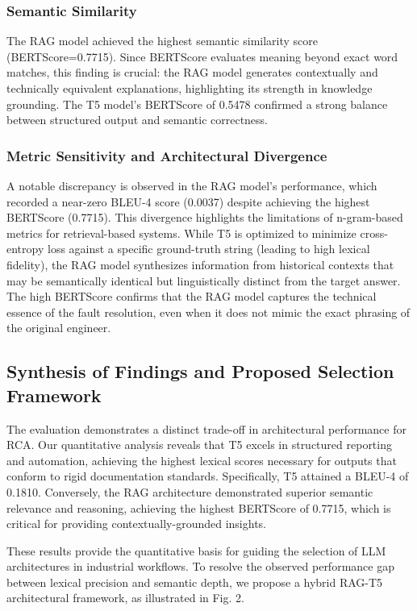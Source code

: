 \documentclass[10pt,twocolumn,journal]{IEEEtran}
\begin{document}
\subsubsection{Semantic Similarity}
The RAG model achieved the highest semantic similarity score (BERTScore=0.7715). Since BERTScore evaluates meaning beyond exact word matches, this finding is crucial: the RAG model generates contextually and technically equivalent explanations, highlighting its strength in knowledge grounding. The T5 model's BERTScore of 0.5478 confirmed a strong balance between structured output and semantic correctness.

\subsubsection{Metric Sensitivity and Architectural Divergence}
A notable discrepancy is observed in the RAG model's performance, which recorded a near-zero BLEU-4 score (0.0037) despite achieving the highest BERTScore (0.7715). This divergence highlights the limitations of n-gram-based metrics for retrieval-based systems. While T5 is optimized to minimize cross-entropy loss against a specific ground-truth string (leading to high lexical fidelity), the RAG model synthesizes information from historical contexts that may be semantically identical but linguistically distinct from the target answer. The high BERTScore confirms that the RAG model captures the technical essence of the fault resolution, even when it does not mimic the exact phrasing of the original engineer.

\subsection{Synthesis of Findings and Proposed Selection Framework}
\label{sec:synthesis}

The evaluation demonstrates a distinct trade-off in architectural performance for RCA. Our quantitative analysis reveals that T5 excels in structured reporting and automation, achieving the highest lexical scores necessary for outputs that conform to rigid documentation standards. Specifically, T5 attained a BLEU-4 of 0.1810. Conversely, the RAG architecture demonstrated superior semantic relevance and reasoning, achieving the highest BERTScore of 0.7715, which is critical for providing contextually-grounded insights. 

These results provide the quantitative basis for guiding the selection of LLM architectures in industrial workflows. To resolve the observed performance gap between lexical precision and semantic depth, we propose a hybrid RAG-T5 architectural framework, as illustrated in Fig. 2.
\end{document}
